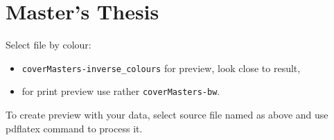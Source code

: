 \documentclass[a4paper]{article}
\begin{document}
\section{Master's Thesis}

Select file by colour:
\begin{itemize}
	\item \verb|coverMasters-inverse_colours| for preview, look close to result,
	\item for print preview use rather \verb|coverMasters-bw|.
\end{itemize}

To create preview with your data, select source file named as above and use pdflatex command to process it.
\end{document}
